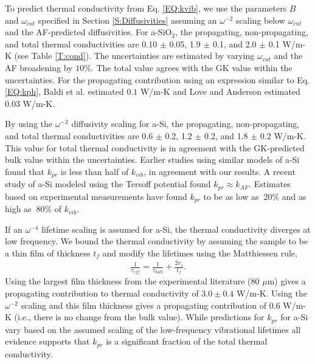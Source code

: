 To predict thermal conductivity from Eq. \eqref{EQ:kvib}, 
we use the parameters $B$ and $\omega_{cut}$ specified 
in Section \ref{S:Diffusivities} assuming an $\omega^{-2}$ 
scaling below $\omega_{cut}$ and the AF-predicted diffusivities. 
For a-SiO$_2$, the propagating, non-propagating, and total thermal 
conductivities are 0.10 $\pm$ 0.05, 1.9 $\pm$ 0.1, 
and 2.0 $\pm$ 0.1 W/m-K (see Table \ref{T:cond}). The uncertainties 
are estimated by varying $\omega_{cut}$ and the AF 
broadening by $10\%$.  
The total value agrees with the GK value within the uncertainties. 
For the propagating contribution 
using an expression similar to Eq. \eqref{EQ:kph}, 
Baldi et al.\cite{baldi_thermal_2008} estimated $0.1$ W/m-K and 
Love and Anderson\cite{love_estimate_1990} estimated 0.03 W/m-K.

By using the $\omega^{-2}$ diffusivity scaling for a-Si, 
the propagating, non-propagating, and total thermal conductivities 
are 0.6 $\pm$ 0.2, 1.2 $\pm$ 0.2, and 1.8 $\pm$ 0.2 W/m-K. 
This value for total thermal conductivity 
is in agreement with the GK-predicted bulk value within the 
uncertainties. Earlier studies using 
similar models of a-Si found 
that $k_{pr}$ is less than half of 
$k_{vib}$,\cite{feldman_thermal_1993,
feldman_numerical_1999} in agreement with our results.  
A recent study of a-Si modeled using the Tersoff potential found 
$k_{pr} \approx k_{AF}$.\cite{he_heat_2011} 
Estimates based on experimental measurements 
have found $k_{pr}$ to be as low 
as $~20\%$\cite{cahill_thermal_1994,feldman_numerical_1999} 
and as high as $~80\%$ of $k_{vib}$.
\cite{liu_high_2009,yang_anomalously_2010}

If an $\omega^{-4}$ lifetime scaling is assumed for a-Si, 
the thermal conductivity diverges at low frequency. We bound the 
thermal conductivity by assuming the sample to be a thin film 
of thickness $t_f$ and modify the lifetimes using the Matthiessen 
rule,\cite{ziman_electrons_2001} 
\begin{equation}\label{EQ:LambdaMatth}
\begin{split}
\frac{1}{\tau_{eff}} = \frac{1}{\tau_{bulk}} + 
\frac{2v_s}{t_f}.
\end{split}
\end{equation}
Using the largest film thickness from the experimental 
literature ($80$ $\mu$m)\cite{liu_high_2009} 
gives a propagating contribution 
to thermal conductivity of $3.0 \pm 0.4$ W/m-K. 
Using the $\omega^{-2}$ scaling and this film thickness 
gives a propagating contribution of 0.6 W/m-K (i.e., there is 
no change from the bulk value). 
While predictions for $k_{pr}$ for a-Si  
vary based on the assumed scaling of the low-frequency 
vibrational lifetimes
\cite{feldman_thermal_1993,cahill_thermal_1994,
feldman_numerical_1999,liu_high_2009,yang_anomalously_2010,
he_heat_2011} 
all evidence supports that $k_{pr}$ is a significant fraction 
of the total thermal conductivity.
\cite{feldman_thermal_1993,cahill_thermal_1994,
feldman_numerical_1999,liu_high_2009,
yang_anomalously_2010,
he_heat_2011,regner_broadband_2013}

